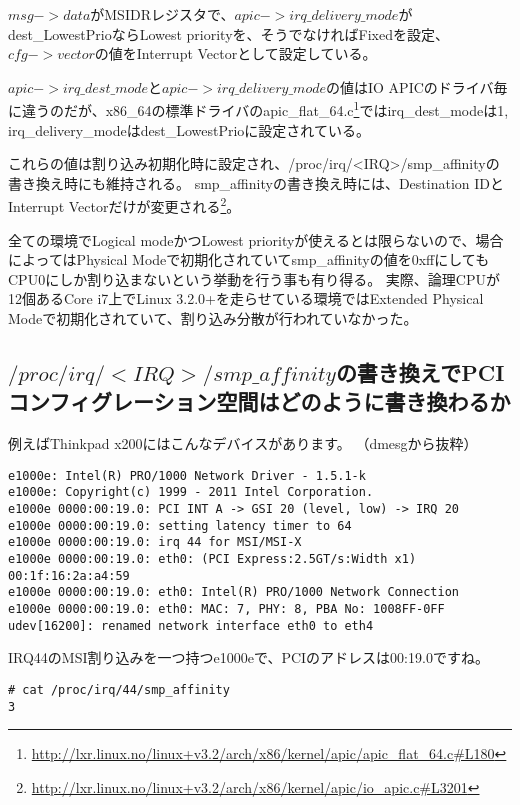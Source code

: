 $msg->data$がMSIDRレジスタで、$apic->irq\_delivery\_mode$がdest\_LowestPrioならLowest priorityを、そうでなければFixedを設定、$cfg->vector$の値をInterrupt Vectorとして設定している。

$apic->irq\_dest\_mode$と$apic->irq\_delivery\_mode$の値はIO APICのドライバ毎に違うのだが、x86\_64の標準ドライバのapic\_flat\_64.c\footnote{\url{http://lxr.linux.no/linux+v3.2/arch/x86/kernel/apic/apic\_flat\_64.c\#L180}}ではirq\_dest\_modeは1, irq\_delivery\_modeはdest\_LowestPrioに設定されている。

これらの値は割り込み初期化時に設定され、/proc/irq/<IRQ>/smp\_affinityの書き換え時にも維持される。
smp\_affinityの書き換え時には、Destination IDとInterrupt Vectorだけが変更される\footnote{\url{http://lxr.linux.no/linux+v3.2/arch/x86/kernel/apic/io\_apic.c\#L3201}}。

全ての環境でLogical modeかつLowest priorityが使えるとは限らないので、場合によってはPhysical Modeで初期化されていてsmp\_affinityの値を0xffにしてもCPU0にしか割り込まないという挙動を行う事も有り得る。
実際、論理CPUが12個あるCore i7上でLinux 3.2.0+を走らせている環境ではExtended Physical Modeで初期化されていて、割り込み分散が行われていなかった。

\subsection{$/proc/irq/<IRQ>/smp\_affinity$の書き換えでPCIコンフィグレーション空間はどのように書き換わるか}
例えばThinkpad x200にはこんなデバイスがあります。
（dmesgから抜粋）

\begin{program}[H]\centering
\begin{verbatim}
e1000e: Intel(R) PRO/1000 Network Driver - 1.5.1-k
e1000e: Copyright(c) 1999 - 2011 Intel Corporation.
e1000e 0000:00:19.0: PCI INT A -> GSI 20 (level, low) -> IRQ 20
e1000e 0000:00:19.0: setting latency timer to 64
e1000e 0000:00:19.0: irq 44 for MSI/MSI-X
e1000e 0000:00:19.0: eth0: (PCI Express:2.5GT/s:Width x1) 00:1f:16:2a:a4:59
e1000e 0000:00:19.0: eth0: Intel(R) PRO/1000 Network Connection
e1000e 0000:00:19.0: eth0: MAC: 7, PHY: 8, PBA No: 1008FF-0FF
udev[16200]: renamed network interface eth0 to eth4
\end{verbatim}
\end{program}

IRQ44のMSI割り込みを一つ持つe1000eで、PCIのアドレスは00:19.0ですね。

\begin{program}[H]\centering
\begin{verbatim}
# cat /proc/irq/44/smp_affinity
3
\end{verbatim}
\end{program}

